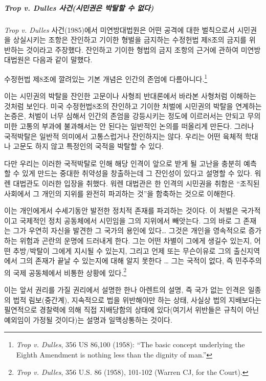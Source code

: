 \subparagraph{\texorpdfstring{\emph{Trop v. Dulles} 사건(시민권은 박탈할 수 없다)}{Trop v. Dulles 사건(시민권은 박탈할 수 없다)}}

\emph{Trop v. Dulles} 사건(1985)에서 미연방대법원은 어떤 공격에 대한 벌칙으로서 시민권을 상실시키는 조항은 잔인하고 기이한 형벌을 금지하는 수정헌법 제8조의 금지를 위반하는 것이라고 주장했다. 잔인하고 기이한 형법의 금지 조항의 근거에 관하여 미연방대법원은 다음과 같이 말했다.

수정헌법 제8조에 깔려있는 기본 개념은 인간의 존엄에 다름아니다.\footnote{\emph{Trop v. Dulles}, 356 US 86,100 (1958): ``The basic concept underlying the Eighth Amendment is nothing less than the dignity of man.''}

이는 시민권의 박탈을 잔인한 고문이나 사형죄 반대론에서 바라본 사형처럼 이해하는 것처럼 보인다. 미국 수정헌법8조의 잔인하고 기이한 처벌에 시민권의 박탈을 연계하는 논증은, 처벌이 너무 심해서 인간의 존엄을 강등시키는 정도에 이르러서는 안되고 무의미한 고통의 부과에 불과해서는 안 된다는 일반적인 논의를 떠올리게 만든다. 그러나 국적박탈은 일반적 의미에서 고통스럽거나 잔인하지는 않다. 우리는 어떤 육체적 학대나 고문도 하지 않고 특정인의 국적을 박탈할 수 있다.

다만 우리는 이러한 국적박탈로 인해 해당 인격이 앞으로 받게 될 고난을 충분히 예측할 수 있게 만드는 중대한 취약성을 창출하는데 그 잔인성이 있다고 설명할 수 있다. 워렌 대법관도 이러한 입장을 취했다. 워렌 대법관은 한 인격의 시민권을 취함은 ``조직된 사회에서 그 개인의 지위를 완전히 파괴하는 것''을 함축하는 것으로 이해한다.

이는 개인에게서 수세기동안 발전한 정치적 존재를 파괴하는 것이다. 이 처벌은 국가적이고 국제적인 정치 공동체에서 시민임을 그의 지위에서 빼앗는다. 그의 바로 그 존재는 그가 우연히 자신을 발견한 그 국가의 용인에 있다\ldots{} 그것은 개인을 영속적으로 증가하는 위험과 곤란의 운명에 드러내게 한다. 그는 어떤 차별이 그에게 생길수 있는지, 어떤 추방/박탈이 그에게 지시될 수 있는지, 그리고 언제 또는 무슨이유로 그의 출신지역에서 그의 존재가 끝날 수 있는지에 대해 알지 못한다 \ldots{} 그는 국적이 없다, 즉 민주주의의 국제 공동체에서 비통한 상황에 있다.\footnote{\emph{Trop v. Dulles}, 356 U.S. 86 (1958), 101-102 (Warren CJ, for the Court).}

이는 앞서 권리를 가질 권리에서 설명한 한나 아렌트의 설명, 즉 국가 없는 인격은 일종의 법적 림보(중간계), 지속적으로 법을 위반해야만 하는 상태, 사실상 법의 지배보다는 필연적으로 경찰력에 의해 직접 지배당함의 상태에 있다(여기서 위반들은 규칙이 아닌 예외임이 가정될 것이다)는 설명과 일맥상통하는 것이다.

